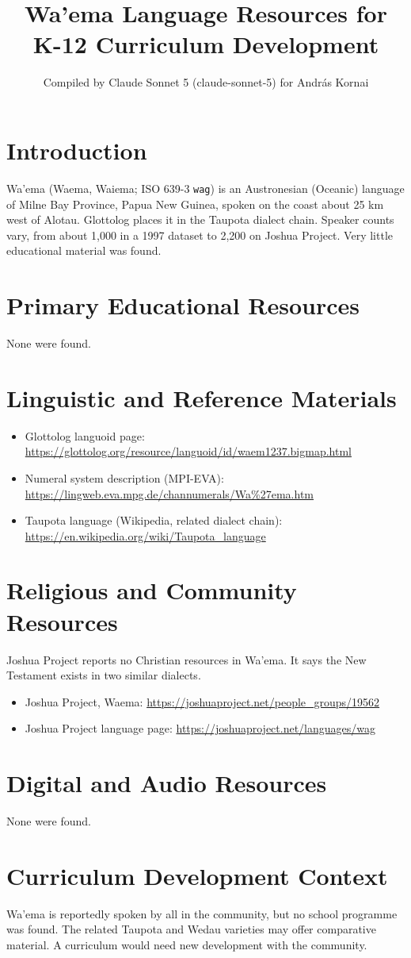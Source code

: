 \documentclass[12pt]{article}
\title{Wa'ema Language Resources for K-12 Curriculum Development}
\author{Compiled by Claude Sonnet 5 (claude-sonnet-5) for Andr\'as Kornai}
\date{}
\begin{document}
\maketitle

\section{Introduction}
Wa'ema (Waema, Waiema; ISO 639-3 \texttt{wag}) is an Austronesian (Oceanic) language of Milne Bay Province, Papua New Guinea, spoken on the coast about 25 km west of Alotau. Glottolog places it in the Taupota dialect chain. Speaker counts vary, from about 1,000 in a 1997 dataset to 2,200 on Joshua Project. Very little educational material was found.

\section{Primary Educational Resources}
None were found.

\section{Linguistic and Reference Materials}
\begin{itemize}
\item Glottolog languoid page: \url{https://glottolog.org/resource/languoid/id/waem1237.bigmap.html}
\item Numeral system description (MPI-EVA): \url{https://lingweb.eva.mpg.de/channumerals/Wa%27ema.htm}
\item Taupota language (Wikipedia, related dialect chain): \url{https://en.wikipedia.org/wiki/Taupota_language}
\end{itemize}

\section{Religious and Community Resources}
Joshua Project reports no Christian resources in Wa'ema. It says the New Testament exists in two similar dialects.
\begin{itemize}
\item Joshua Project, Waema: \url{https://joshuaproject.net/people_groups/19562}
\item Joshua Project language page: \url{https://joshuaproject.net/languages/wag}
\end{itemize}

\section{Digital and Audio Resources}
None were found.

\section{Curriculum Development Context}
Wa'ema is reportedly spoken by all in the community, but no school programme was found. The related Taupota and Wedau varieties may offer comparative material. A curriculum would need new development with the community.
\end{document}
